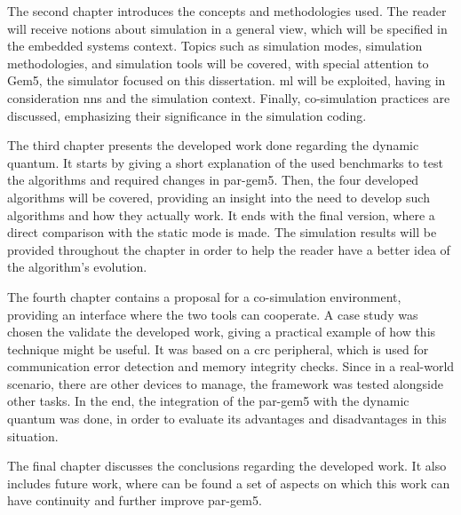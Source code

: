 The second chapter introduces the concepts and methodologies used. The reader will receive notions about simulation in a general view, which 
will be specified in the embedded systems context. Topics such as simulation modes, simulation methodologies, and simulation tools 
will be covered, with special attention to Gem5, the simulator focused on this dissertation. \gls{ml} will be exploited, having in 
consideration \glspl{nn} and the simulation context. Finally, co-simulation practices are discussed, emphasizing their significance in the 
simulation coding.

The third chapter presents the developed work done regarding the dynamic quantum. It starts by giving a short explanation of the used benchmarks
to test the algorithms and required changes in par-gem5. Then, the four developed algorithms will be covered, providing an insight into the need to develop 
such algorithms and how they actually work. It ends with the final version, where a direct comparison with the static mode is made. The 
simulation results will be provided throughout the chapter in order to help the reader have a better idea of the algorithm's evolution.

The fourth chapter contains a proposal for a co-simulation environment, providing an interface where the two tools can cooperate. 
A case study was chosen the validate the developed work, giving a practical example of how this technique might be useful. 
It was based on a \gls{crc} peripheral, which is used for communication error detection and memory integrity checks. 
Since in a real-world scenario, there are other devices to manage, the framework was tested alongside other tasks. In the end, the integration
of the par-gem5 with the dynamic quantum was done, in order to evaluate its advantages and disadvantages in this situation. 

The final chapter discusses the conclusions regarding the developed work. It also includes future work, where can be found a set of 
aspects on which this work can have continuity and further improve par-gem5. 

